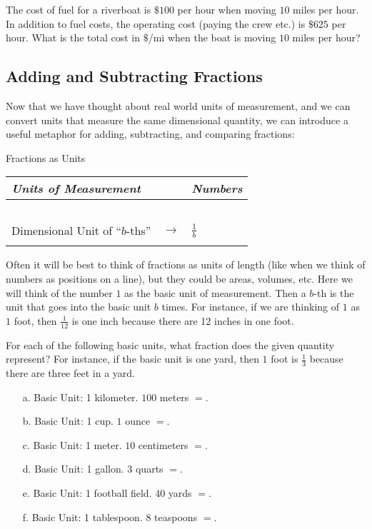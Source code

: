  The cost of fuel for a riverboat is $\$100$ per hour when moving $10$ miles per hour. In addition to fuel costs, the operating cost (paying the crew etc.) is $\$625$ per hour. What is the total cost in $\$$/mi when the boat is moving $10$ miles per hour?


\subsection{Adding and Subtracting Fractions}
Now that we have thought about real world units of measurement, and we can convert units that measure the same dimensional quantity, we can introduce a useful metaphor for adding, subtracting, and comparing fractions:
\begin{center}
Fractions as Units
\begin{tabular}{|p{2in} c p{1.5in}|}
\hline\hline \it{Units of Measurement} & & \it{Numbers}\\
\hline\ & \ & \\
Dimensional Unit of ``$b$-ths'' & $\rightarrow$ & $\frac{1}{b}$ \\&&\\
\hline
\end{tabular}  
\end{center}

Often it will be best to think of fractions as units of length (like when we think of numbers as positions on a line), but they could be areas, volumes, etc. Here we will think of the number $1$ as the basic unit of measurement. Then a $b$-th is the unit that goes into the basic unit $b$ times. For instance, if we are thinking of $1$ as $1$ foot, then $\frac{1}{12}$ is one inch because there are 12 inches in one foot.

\par

\begin{question} For each of the following basic units, what fraction does the given quantity represent? For instance, if the basic unit is one yard, then $1$ foot is $\frac{1}{3}$ because there are three feet in a yard.
\begin{enumerate}
\item[a.] Basic Unit: 1 kilometer. $100$ meters $ =$\underline{\hspace{1in}}. 
\item[b.] Basic Unit: 1 cup. $1$ ounce  $ =$\underline{\hspace{1in}}. 
\item[c.] Basic Unit: 1 meter. $10$ centimeters $ =$\underline{\hspace{1in}}. 
\item[d.] Basic Unit: 1 gallon. $3$ quarts $ =$\underline{\hspace{1in}}. 
\item[e.] Basic Unit: 1 football field. $40$ yards $ =$\underline{\hspace{1in}}.
\item[f.] Basic Unit: 1 tablespoon. $8$ teaspoons $ =$\underline{\hspace{1in}}.  
\end{enumerate}
\end{question}

